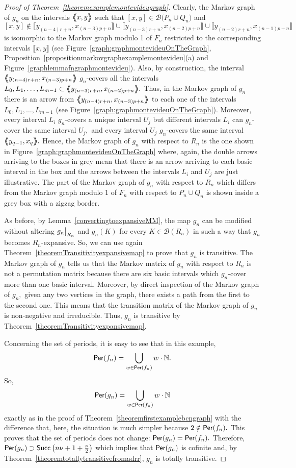 \documentclass[a4paper, 11pt]{amsart}
\numberwithin{equation}{section}
\theoremstyle{customnumberedtheorem}
\theoremstyle{definitionwithbfnote}
\newcommand{\N}{\ensuremath{\mathbb{N}}}
\DeclareMathOperator{\Per}{\textsf{\upshape Per}}
\DeclareMathOperator{\Succ}{\textsf{\upshape Succ}}
\newcommand{\succs}[1]{\ensuremath{\Succ\left(#1\right)}}
\newcommand{\BIclass}[1]{\ensuremath{\llbracket #1\rrbracket}}
\newcommand{\BIgraph}[1]{\ensuremath{\mathopen{\bigl\langle\mkern-7.8mu\bigl\langle\mspace{-6.5mu}\bigl\langle} #1 \mathclose{\bigr\rangle\mspace{-6.5mu}\bigr\rangle\mkern-7.8mu\bigr\rangle}}}
\def\calB{\mathcal{B}}
\newcommand{\SBI}[1][Q]{\ensuremath{\calB(#1)}}
\newcommand{\bigSBI}[1]{\ensuremath{\calB\bigl(#1\bigr)}}
\newcommand{\evalat}[1]{\bigr\rvert\sb{#1}}
\begin{document}
\begin{proof}[Proof of Theorem~\ref{theoremexamplemontevideugraph}]
Clearly, the Markov graph of $g_n$ on the intervals
$\BIgraph{x,y}$ such that $[x,y] \in \bigSBI{P_n \cup Q_n}$ and
\[
[x,y] \notin \BIclass{y_{(n-4)r+n}, x_{(n-3)p+n}} \cup \BIclass{y_{(n-3)r+n}, x_{(n-2)p+n}} \cup \BIclass{y_{(n-2)r+n}, x_{(n-1)p+n}}
\]
is isomorphic to the Markov graph modulo 1 of $F_n$ restricted to the
corresponding intervals $\BIclass{x,y}$ (see
Figure~\ref{graph:graphmontevideuOnTheGraph},
Proposition~\ref{propositionmarkovgraphexamplemontevideu}(a) and
Figure~\ref{graphlemmafngraphmontevideu}).
Also, by construction, the interval
$\BIgraph{y_{(n-4)r+n}, x_{(n-3)p+n}}$ $g_n$-covers all the intervals
$L_0,L_1,\dots,L_{m-1} \subset \BIgraph{y_{(n-3)r+n}, x_{(n-2)p+n}}.$
Thus, in the Markov graph of $g_n$ there is an arrow from
$\BIgraph{y_{(n-4)r+n}, x_{(n-3)p+n}}$ to each one of the intervals
$L_0,L_1,\dots,L_{m-1}$ (see Figure~\ref{graph:graphmontevideuOnTheGraph}).
Moreover, every interval $L_i$ $g_n$-covers a unique interval $U_j$
but different intervals $L_i$ can $g_n$-cover the same interval $U_j,$
and every interval $U_j$ $g_n$-covers the same interval
$\BIgraph{y_{q-1}, x_{q}}.$
Hence, the Markov graph of $g_n$ with respect to $R_n$ is the one
shown in Figure~\ref{graph:graphmontevideuOnTheGraph}
where, again, the double arrows arriving to the boxes in grey mean
that there is an arrow arriving to each basic interval in the box
and the arrows between the intervals $L_i$ and $U_j$
are just illustrative.
The part of the Markov graph of $g_n$ with respect to $R_n$
which differs from the Markov graph modulo 1 of $F_n$ with respect to
$P_n \cup Q_n$ is shown inside a grey box with a zigzag border.


As before, by Lemma~\ref{convertingtoexpansiveMM},
the map $g_n$ can be modified
without altering $g_n\evalat{R_n}$ and $g_n(K)$
for every $K \in \SBI[R_n]$ in such a way that
$g_n$ becomes $R_n$-expansive. So, we can use
again Theorem~\ref{theoremTransitivityexpansivemap}
to prove that $g_n$ is transitive.
The Markov graph of $g_n$ tells us that the Markov matrix of $g_n$
with respect to $R_n$ is not a permutation matrix because there are
six basic intervals which $g_n$-cover more than one basic interval.
Moreover, by direct inspection of the Markov graph of $g_n,$
given any two vertices in the graph, there exists a path from the
first to the second one. This means that the transition matrix of the
Markov graph of $g_n$ is non-negative and irreducible.
Thus, $g_n$ is transitive by
Theorem~\ref{theoremTransitivityexpansivemap}.

Concerning the set of periods, it is easy to see that in this example,
\[ \Per(f_n) = \bigcup_{w\in\Per(f_n)} w\cdot\N. \]
So,
\[
\Per(g_n) = \bigcup_{w\in\Per(f_n)} w\cdot\N
\]
exactly as in the proof of Theorem~\ref{theoremfirstexamplebcngraph}
with the difference that, here, the situation is much simpler because
$2 \notin \Per(f_n).$
This proves that the set of periods does not change:
$\Per(g_n) = \Per(f_n).$
Therefore,
$\Per(g_n) \supset \succs{n\nu+1+\tfrac{\nu}{2}}$ which implies that
$\Per(g_n)$ is cofinite and,
by Theorem~\ref{theoremtotallytransitivefromadrr}, $g_n$ is totally transitive.


\end{proof}
\end{document}
